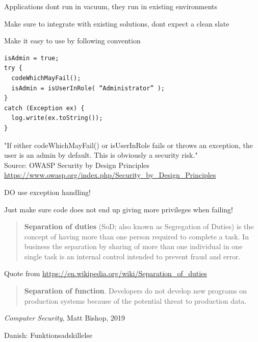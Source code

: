\documentclass[Screen16to9,17pt]{foils}
\begin{document}
\begin{list2}
\item Applications dont run in vacuum, they run in existing environments
\item Make sure to integrate with existing solutions, dont expect a clean slate
\item Make it easy to use by following convention
\end{list2}


\begin{verbatim}
isAdmin = true;
try {
  codeWhichMayFail();
  isAdmin = isUserInRole( “Administrator” );
}
catch (Exception ex) {
  log.write(ex.toString());
}
\end{verbatim}
"If either codeWhichMayFail() or isUserInRole fails or throws an exception, the user is an admin by default. This is obviously a security risk."\\
Source: OWASP Security by Design Principles\\
\url{https://www.owasp.org/index.php/Security_by_Design_Principles}

\begin{list2}
\item DO use exception handling!
\item Just make sure code does not end up giving more privileges when failing!
\end{list2}


\begin{quote}
{\bf Separation of duties} (SoD; also known as Segregation of Duties) is the concept of having more than one person required to complete a task. In business the separation by sharing of more than one individual in one single task is an internal control intended to prevent fraud and error.
\end{quote}

Quote from \url{https://en.wikipedia.org/wiki/Separation_of_duties}

\begin{quote}
{\bf Separation of function}. Developers do not develop new programs on production systems because of the potential threat to production data.
\end{quote}
\emph{Computer Security}, Matt Bishop, 2019

Danish: Funktionsadskillelse


\end{document}
